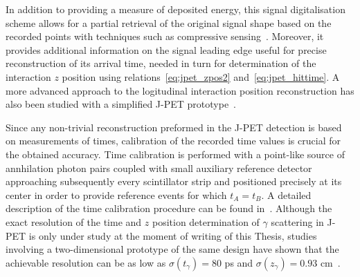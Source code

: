 In addition to providing a measure of deposited energy, this signal digitalisation scheme allows for a partial retrieval of the original signal shape based on the recorded points with techniques such as compressive sensing~\cite{lech_compressive}. Moreover, it provides additional information on the signal leading edge useful for precise reconstruction of its arrival time, needed in turn for determination of the interaction $z$ position using relations~\ref{eq:jpet_zpos2} and~\ref{eq:jpet_hittime}. A more advanced approach to the logitudinal interaction position reconstruction has also been studied with a simplified J-PET prototype~\cite{neha_synchronized}.

Since any non-trivial reconstruction preformed in the J-PET detection 
is based on measurements of times, 
calibration of the recorded time values is crucial for the obtained accuracy. Time calibration is performed with a point-like source of annhilation photon pairs coupled with small auxiliary reference detector approaching subsequently every scintillator strip and positioned precisely at its center in order to provide reference events for which $t_A=t_B$. A detailed description of the time calibration procedure can be found in~\cite{jpet_time_calibration}.
Although the exact resolution of the time and $z$ position determination of $\gamma$ scattering in J-PET is only under study at the moment of writing of this Thesis, studies involving a two-dimensional prototype of the same design have shown that the achievable resolution can be as low as $\sigma(t_{\gamma}) = 80$ ps and  $\sigma(z_{\gamma}) = 0.93$ cm~\cite{jpet_single_module}.

